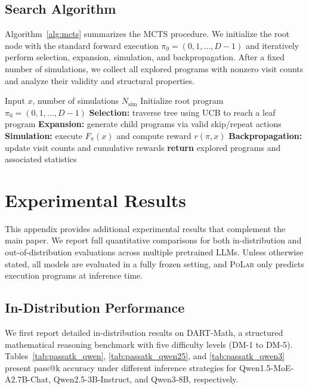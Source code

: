 \documentclass{article}
\theoremstyle{plain}
\theoremstyle{definition}
\theoremstyle{remark}
\newcommand\ours{\textsc{PoLar}\xspace}
\begin{document}
\subsection{Search Algorithm}

Algorithm~\ref{alg:mcts} summarizes the MCTS procedure.
We initialize the root node with the standard forward execution
$\pi_0 = (0,1,\ldots,D-1)$
and iteratively perform selection, expansion, simulation, and backpropagation.
After a fixed number of simulations,
we collect all explored programs with nonzero visit counts
and analyze their validity and structural properties.

\begin{algorithm}[t]
\caption{Monte Carlo Tree Search for Execution Programs}
\label{alg:mcts}
\begin{algorithmic}[1]
\REQUIRE Input $x$, number of simulations $N_{\text{sim}}$
\STATE Initialize root program $\pi_0 = (0,1,\ldots,D-1)$
    \STATE \textbf{Selection:} traverse tree using UCB to reach a leaf program
    \STATE \textbf{Expansion:} generate child programs via valid skip/repeat actions
    \STATE \textbf{Simulation:} execute $F_{\pi}(x)$ and compute reward $r(\pi, x)$
    \STATE \textbf{Backpropagation:} update visit counts and cumulative rewards
\ENDFOR
\STATE \textbf{return} explored programs and associated statistics
\end{algorithmic}
\end{algorithm}


\clearpage

\section{Experimental Results}
\label{app:experiment_result}

This appendix provides additional experimental results that complement the main paper.
We report full quantitative comparisons for both in-distribution and out-of-distribution evaluations across multiple pretrained LLMs.
Unless otherwise stated, all models are evaluated in a fully frozen setting, and \ours only predicts execution programs at inference time.

\subsection{In-Distribution Performance}
\label{app:id_pref}

We first report detailed in-distribution results on DART-Math, a structured mathematical reasoning benchmark with five difficulty levels (DM-1 to DM-5).
Tables~\ref{tab:passatk_qwen}, \ref{tab:passatk_qwen25}, and \ref{tab:passatk_qwen3} present pass@k accuracy under different inference strategies for Qwen1.5-MoE-A2.7B-Chat, Qwen2.5-3B-Instruct, and Qwen3-8B, respectively.
\end{document}
